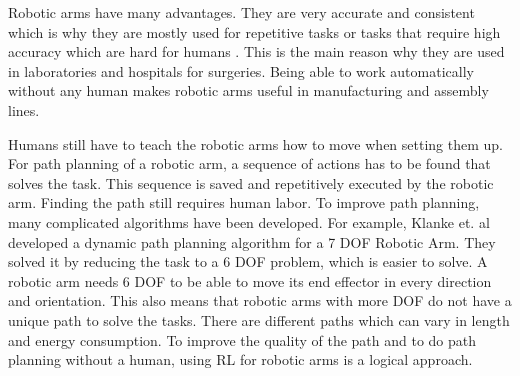 \vspace{0.5cm}

Robotic arms have many advantages. They are very accurate and consistent which is why they are mostly used for repetitive tasks or tasks that require high accuracy which are hard for humans \cite{roboarmuk}. 
This is the main reason why they are used in laboratories and hospitals for surgeries. Being able to work automatically without any human makes robotic arms useful in manufacturing and assembly lines. 

\vspace{0.5cm}

Humans still have to teach the robotic arms how to move when 
setting them up. For path planning of a robotic arm, a sequence of actions has to be found that solves the task. This sequence is saved and repetitively executed by the robotic arm. Finding the path still requires human labor. To improve path planning, many complicated algorithms have been developed. For example, Klanke et. al \cite{dynpath} developed a dynamic path planning algorithm for a 7 DOF Robotic Arm. They solved it by reducing the task to a 6 DOF problem, which is easier to solve.
A robotic arm needs 6 DOF to be able to move its end effector in every direction and orientation. This also means that robotic arms with more DOF do not have a unique path to solve the tasks. There are different paths which can vary in length and energy consumption.
To improve the quality of the path and to do path planning without a human, using RL for robotic arms is a logical approach. 

\vspace{0.5cm}

